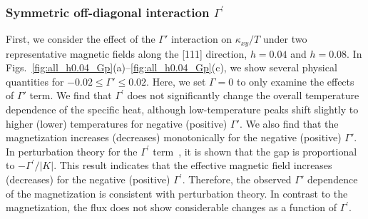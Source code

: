 \documentclass[twocolumn,superscriptaddress,showpacs, longbibliography, aps, prb]{revtex4-2}
\newcommand{\red}[1]{\textcolor{red}{#1}}
\newcommand{\blue}[1]{\textcolor{blue}{#1}}
\newcommand{\orange}[1]{\textcolor{orange}{#1}}
\begin{document}
\subsubsection{Symmetric off-diagonal interaction $\Gamma^{\prime}$}
First, we consider the effect of the $\Gamma'$ interaction 
on $\kappa_{xy}/T$ %
under two representative magnetic fields %
along the [111] direction, 
$h=0.04$ and $h=0.08$. In Figs.~\ref{fig:all_h0.04_Gp}(a)--\ref{fig:all_h0.04_Gp}(c), 
we show several physical quantities for $-0.02\leq\Gamma'\leq0.02$. 
Here, we set %
$\Gamma = 0$ to only examine the %
effects of $\Gamma'$ term. 
We find that $\Gamma^{\prime}$ does not significantly change 
the overall temperature dependence of the specific heat, %
although low-temperature peaks %
shift slightly to higher (lower) temperatures %
for negative (positive) %
$\Gamma'$. %
We also find that the magnetization increases (decreases) monotonically for the negative (positive) $\Gamma'$.
In perturbation theory for the $\Gamma^{\prime}$ term~\cite{Takikawa_PRB2020}, it is shown that the gap is proportional to $-\Gamma^{\prime}/|K|$. This result
indicates that the effective magnetic field increases (decreases)
for the negative (positive)  $\Gamma^{\prime}$.
Therefore, the observed  $\Gamma'$ dependence of the magnetization 
is consistent with perturbation theory.
In contrast to the magnetization, 
the flux does not show considerable changes as a function of $\Gamma^{\prime}$.
\end{document}
